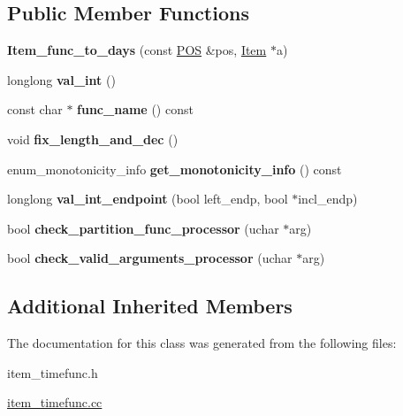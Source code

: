\subsection*{Public Member Functions}
\begin{DoxyCompactItemize}
\item 
\mbox{\label{classItem__func__to__days_a12af34d4311e46e403f638cb3d38bce4}} 
{\bfseries Item\+\_\+func\+\_\+to\+\_\+days} (const \mbox{\hyperlink{structYYLTYPE}{P\+OS}} \&pos, \mbox{\hyperlink{classItem}{Item}} $\ast$a)
\item 
\mbox{\label{classItem__func__to__days_ad4760924160ee7661e2110351d09361c}} 
longlong {\bfseries val\+\_\+int} ()
\item 
\mbox{\label{classItem__func__to__days_ac2244006efbb6c686bacab26b43373be}} 
const char $\ast$ {\bfseries func\+\_\+name} () const
\item 
\mbox{\label{classItem__func__to__days_a9fe5960f64be8455ed4998541211a68b}} 
void {\bfseries fix\+\_\+length\+\_\+and\+\_\+dec} ()
\item 
\mbox{\label{classItem__func__to__days_a648e59b21fecb432696148fa97cf660b}} 
enum\+\_\+monotonicity\+\_\+info {\bfseries get\+\_\+monotonicity\+\_\+info} () const
\item 
\mbox{\label{classItem__func__to__days_a95e1e31d6c15116276e3f77675ad4277}} 
longlong {\bfseries val\+\_\+int\+\_\+endpoint} (bool left\+\_\+endp, bool $\ast$incl\+\_\+endp)
\item 
\mbox{\label{classItem__func__to__days_a93f880846a7c92ab8db24268bf920fec}} 
bool {\bfseries check\+\_\+partition\+\_\+func\+\_\+processor} (uchar $\ast$arg)
\item 
\mbox{\label{classItem__func__to__days_aaa4381c62b6e94a06232d7d1d791a376}} 
bool {\bfseries check\+\_\+valid\+\_\+arguments\+\_\+processor} (uchar $\ast$arg)
\end{DoxyCompactItemize}
\subsection*{Additional Inherited Members}


The documentation for this class was generated from the following files\+:\begin{DoxyCompactItemize}
\item 
item\+\_\+timefunc.\+h\item 
\mbox{\hyperlink{item__timefunc_8cc}{item\+\_\+timefunc.\+cc}}\end{DoxyCompactItemize}
